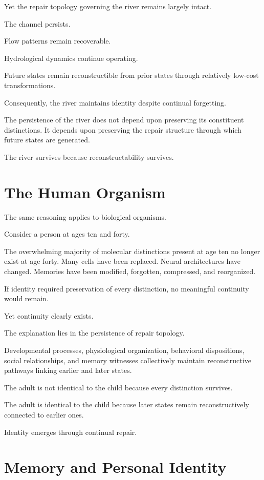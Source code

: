 \documentclass[12pt,oneside]{book}
\theoremstyle{plain} \newtheorem{theorem}{Theorem}[chapter] \newtheorem{lemma}[theorem]{Lemma} \newtheorem{proposition}[theorem]{Proposition} \newtheorem{corollary}[theorem]{Corollary}
\theoremstyle{definition} \newtheorem{definition}[theorem]{Definition} \newtheorem{axiom}[theorem]{Axiom} \newtheorem{construction}[theorem]{Construction}
\theoremstyle{remark} \newtheorem{remark}[theorem]{Remark} \newtheorem{example}[theorem]{Example}
\begin{document}
Yet the repair topology governing the river remains largely intact.

The channel persists.

Flow patterns remain recoverable.

Hydrological dynamics continue operating.

Future states remain reconstructible from prior states through relatively low-cost transformations.

Consequently, the river maintains identity despite continual forgetting.

The persistence of the river does not depend upon preserving its constituent distinctions. It depends upon preserving the repair structure through which future states are generated.

The river survives because reconstructability survives.

\section{The Human Organism}

The same reasoning applies to biological organisms.

Consider a person at ages ten and forty.

The overwhelming majority of molecular distinctions present at age ten no longer exist at age forty. Many cells have been replaced. Neural architectures have changed. Memories have been modified, forgotten, compressed, and reorganized.

If identity required preservation of every distinction, no meaningful continuity would remain.

Yet continuity clearly exists.

The explanation lies in the persistence of repair topology.

Developmental processes, physiological organization, behavioral dispositions, social relationships, and memory witnesses collectively maintain reconstructive pathways linking earlier and later states.

The adult is not identical to the child because every distinction survives.

The adult is identical to the child because later states remain reconstructively connected to earlier ones.

Identity emerges through continual repair.

\section{Memory and Personal Identity}
\end{document}
